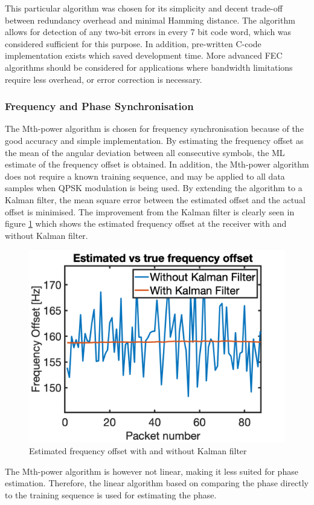 This particular algorithm was chosen for its simplicity and decent trade-off between redundancy overhead and minimal Hamming distance. The algorithm allows for detection of any two-bit errors in every 7 bit code word, which was considered sufficient for this purpose. In addition, pre-written C-code implementation exists \cite{hamming} which saved development time. More advanced FEC algorithms should be considered for applications where bandwidth limitations require less overhead, or error correction is necessary. 

\subsubsection{Frequency and Phase Synchronisation}
The Mth-power algorithm is chosen for frequency synchronisation because of the good accuracy and simple implementation. By estimating the frequency offset as the mean of the angular deviation between all consecutive symbols, the ML estimate of the frequency offset is obtained. In addition, the Mth-power algorithm does not require a known training sequence, and may be applied to all data samples when QPSK modulation is being used. By extending the algorithm to a Kalman filter, the mean square error between the estimated offset and the actual offset is minimised. The improvement from the Kalman filter is clearly seen in figure \ref{fig:kalman_freq} which shows the estimated frequency offset at the receiver with and without Kalman filter.

\begin{figure}[htbp]
\centering
\includegraphics[width=\figW\linewidth]{KalmanFreq.png}
\caption{Estimated frequency offset with and without Kalman filter}
\label{fig:kalman_freq}

\end{figure}

The Mth-power algorithm is however not linear, making it less suited for phase estimation. Therefore, the linear algorithm based on comparing the phase directly to the training sequence is used for estimating the phase.
 





